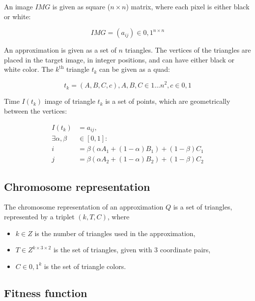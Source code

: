 \documentclass[conference]{IEEEtran}
\begin{document}
An image $IMG$ is given as square ($n \times n$) matrix, where each pixel is
either black or white:

\begin{equation}
	IMG = (a_{ij}) \in {0,1}^{n \times n}
\end{equation}

An approximation is given as a set of $n$ triangles. The vertices of
the triangles are placed in the target image, in integer positions,
and can have either black or white color. The $k^\text{th}$ triangle
$t_k$ can be given as a quad:

\begin{equation}
	t_k = (A, B, C, c), A, B, C \in {1 \dots n}^2, c \in {0, 1}
\end{equation}

Time $I(t_k)$ image of triangle $t_k$ is a set of points, which are geometrically
between the vertices:

\begin{equation}
	\begin{split}
	I(t_k) &= {a_{ij}},\\
	\exists \alpha, \beta &\in [0, 1]:\\
	i &= \beta(\alpha A_1 + (1-\alpha)B_1)+(1-\beta)C_1\\
	j &= \beta(\alpha A_2 + (1-\alpha)B_2)+(1-\beta)C_2
	\end{split}
\end{equation}

\subsection{Chromosome representation}

The chromosome representation of an approximation $Q$ is
a set of triangles, represented by a triplet $(k, T, C)$, where

\begin{itemize}

	\item{$k \in Z$ is the number of triangles used in the approximation,}

	\item{$T \in Z^{k \times 3 \times 2}$ is the set of triangles,
	given with 3 coordinate pairs,}

	\item{$C \in {0,1}^k$ is the set of triangle colors.}

\end{itemize}

\subsection{Fitness function}
\end{document}
